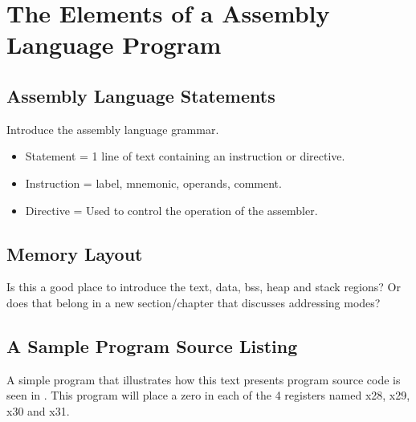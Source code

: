 \chapter{The Elements of a Assembly Language Program}
\label{chapter:elements}

\section{Assembly Language Statements}

Introduce the assembly language grammar.
\begin{itemize}
\item Statement = 1 line of text containing an instruction or directive.
\item Instruction = label, mnemonic, operands, comment.
\item Directive = Used to control the operation of the assembler.
\end{itemize}

\section{Memory Layout}

Is this a good place to introduce the text, data, bss, heap and stack regions?
Or does that belong in a new section/chapter that discusses addressing modes?

\section{A Sample Program Source Listing}

A simple program that illustrates how this text presents
program source code is seen in .
This program will place a zero in each of the 4 registers
named x28, x29, x30 and x31.


